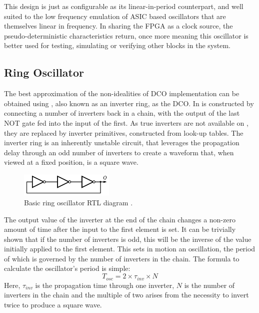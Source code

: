 This design is just as configurable as its linear-in-period counterpart, and well suited to the low frequency emulation of \ac{ASIC} based oscillators that are themselves linear in frequency. In sharing the \ac{FPGA} as a clock source, the pseudo-deterministic characteristics return, once more meaning this oscillator is better used for testing, simulating or verifying other blocks in the system.

\subsection{Ring Oscillator}
The best approximation of the non-idealities of  \ac{DCO} implementation can be obtained using , also known as an inverter ring, as the \ac{DCO}. In   is constructed by connecting a number of inverters back in a chain, with the output of the last NOT gate fed into the input of the first. As true inverters are not available on , they are replaced by inverter primitives, constructed from look-up tables. The inverter ring is an inherently unstable circuit, that leverages the propagation delay through an odd number of inverters to create a waveform that, when viewed at a fixed position, is a square wave. 
\begin{figure}[h]
	\centering
	\includegraphics[width=0.4\textwidth]{../RO-wiki}
	\caption[Basic ring oscillator \ac{RTL} diagram]{Basic ring oscillator \ac{RTL} diagram \cite{ro_wiki}.}
	\label{fig:ro_wiki}
\end{figure}

The output value of the inverter at the end of the chain changes a non-zero amount of time after the input to the first element is set. It can be trivially shown that if the number of inverters is odd, this will be the inverse of the value initially applied to the first element. This sets in motion an oscillation, the period of which is governed by the number of inverters in the chain. The formula to calculate the oscillator's period is simple:
\begin{equation}
	T_{osc} = 2\times \tau_{inv} \times N
\end{equation}
Here, $\tau_{inv}$ is the propagation time through one inverter, $N$ is the number of inverters in the chain and the multiple of two arises from the necessity to invert twice to produce a square wave.

